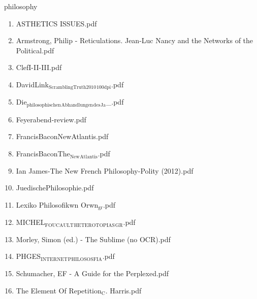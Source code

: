 \documentclass[11pt]{article}
\begin{document}
\item philosophy
\label{sec-1-1-1-1-34}
\begin{enumerate}
\item ASTHETICS ISSUES.pdf
\label{sec-1-1-1-1-34-1}

\item Armstrong, Philip - Reticulations. Jean-Luc Nancy and the Networks of the Political.pdf
\label{sec-1-1-1-1-34-2}

\item ClefI-II-III.pdf
\label{sec-1-1-1-1-34-3}

\item DavidLink$_{\text{ScramblingTruth2010}}$$_{\text{100dpi}}$.pdf
\label{sec-1-1-1-1-34-4}

\item Die$_{\text{philosophischen}}$$_{\text{Abhandlungen}}$$_{\text{des}}$$_{\text{Ja}}$\_.pdf
\label{sec-1-1-1-1-34-5}

\item Feyerabend-review.pdf
\label{sec-1-1-1-1-34-6}

\item FrancisBaconNewAtlantis.pdf
\label{sec-1-1-1-1-34-7}

\item FrancisBaconThe$_{\text{New}}$$_{\text{Atlantis}}$.pdf
\label{sec-1-1-1-1-34-8}

\item Ian James-The New French Philosophy-Polity (2012).pdf
\label{sec-1-1-1-1-34-9}

\item JuedischePhilosophie.pdf
\label{sec-1-1-1-1-34-10}

\item Lexiko Philosofikwn Orwn$_{\text{gr}}$.pdf
\label{sec-1-1-1-1-34-11}

\item MICHEL$_{\text{FOUCAULT}}$$_{\text{HETEROTOPIAS}}$$_{\text{GR}}$.pdf
\label{sec-1-1-1-1-34-12}

\item Morley, Simon (ed.) - The Sublime (no OCR).pdf
\label{sec-1-1-1-1-34-13}

\item PHGES$_{\text{INTERNET}}$$_{\text{PHILOSOSFIA}}$.pdf
\label{sec-1-1-1-1-34-14}

\item Schumacher, EF - A Guide for the Perplexed.pdf
\label{sec-1-1-1-1-34-15}

\item The Element Of Repetition$_{\text{C}}$. Harris.pdf
\label{sec-1-1-1-1-34-16}


\end{enumerate}
\end{document}
